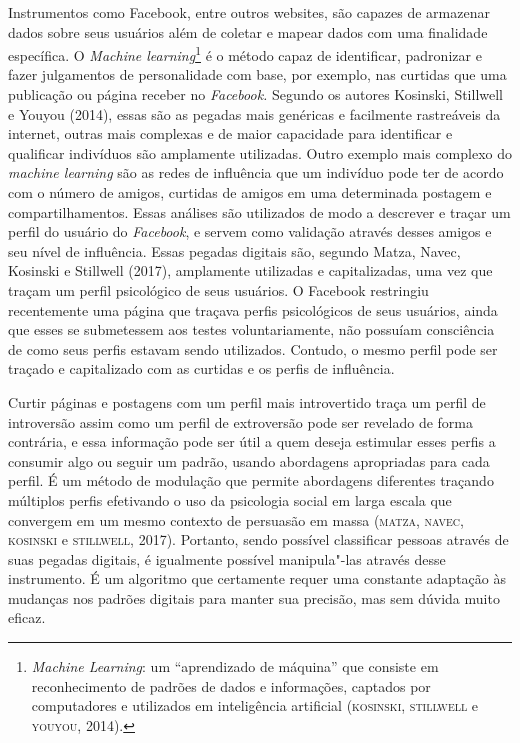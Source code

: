 Instrumentos como Facebook, entre outros websites, são capazes de
armazenar dados sobre seus usuários além de coletar e mapear dados com
uma finalidade específica. O \emph{Machine learning}\footnote{\emph{Machine
  Learning}: um ``aprendizado de máquina'' que consiste em reconhecimento
  de padrões de dados e informações, captados por computadores e
  utilizados em inteligência artificial (\textsc{kosinski}, \textsc{stillwell} e \textsc{youyou},
  2014).} é o método capaz de identificar, padronizar e fazer julgamentos
de personalidade com base, por exemplo, nas curtidas que uma publicação
ou página receber no \emph{Facebook.} Segundo os autores
Kosinski, Stillwell e Youyou (2014), essas são as pegadas mais genéricas
e facilmente rastreáveis da internet, outras mais complexas e de maior
capacidade para identificar e qualificar indivíduos são amplamente
utilizadas. Outro exemplo mais complexo do \emph{machine learning} são
as redes de influência que um indivíduo pode ter de acordo com o número
de amigos, curtidas de amigos em uma determinada postagem e
compartilhamentos. Essas análises são utilizados de modo a descrever
e traçar um perfil do usuário do \emph{Facebook}, e servem como
validação através desses amigos e seu nível de influência. Essas pegadas
digitais são, segundo Matza, Navec, Kosinski e Stillwell (2017),
amplamente utilizadas e capitalizadas, uma vez que traçam um perfil
psicológico de seus usuários. O Facebook restringiu recentemente uma
página que traçava perfis psicológicos de seus usuários, ainda que esses
se submetessem aos testes voluntariamente, não possuíam consciência de
como seus perfis estavam sendo utilizados. Contudo, o mesmo perfil pode
ser traçado e capitalizado com as curtidas e os perfis de influência.

Curtir páginas e postagens com um perfil mais introvertido traça um
perfil de introversão assim como um perfil de extroversão pode ser
revelado de forma contrária, e essa informação pode ser útil a quem
deseja estimular esses perfis a consumir algo ou seguir um padrão,
usando abordagens apropriadas para cada perfil. É um método de modulação
que permite abordagens diferentes traçando múltiplos perfis efetivando o
uso da psicologia social em larga escala que convergem em um mesmo
contexto de persuasão em massa (\textsc{matza}, \textsc{navec}, \textsc{kosinski} e \textsc{stillwell}, 2017).
Portanto, sendo possível classificar pessoas através de suas pegadas
digitais, é igualmente possível manipula"-las através desse instrumento.
É um algoritmo que certamente requer uma constante adaptação às mudanças
nos padrões digitais para manter sua precisão, mas sem dúvida muito
eficaz.

